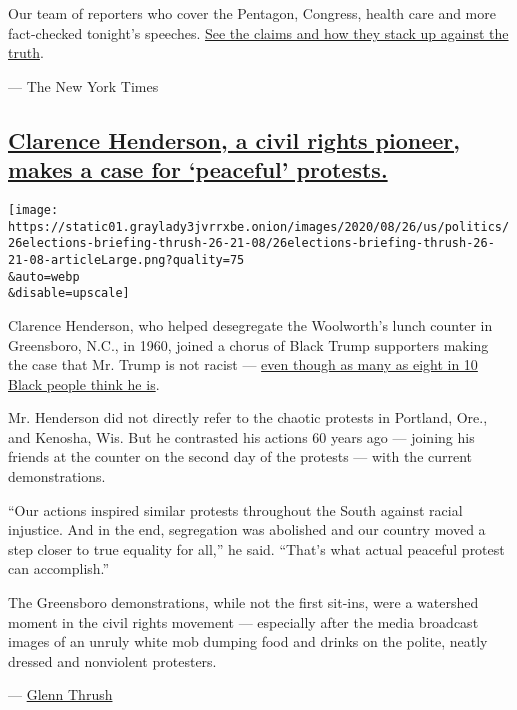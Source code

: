 Our team of reporters who cover the Pentagon, Congress, health care and
more fact-checked tonight's speeches.
\href{https://www.nytimes3xbfgragh.onion/live/2020/08/26/us/rnc-fact-check}{See
the claims and how they stack up against the truth}.

--- The New York Times

\hypertarget{clarence-henderson-a-civil-rights-pioneer-makes-a-case-for-peaceful-protests}{%
\subsection{\texorpdfstring{\protect\hyperlink{clarence-henderson-a-civil-rights-pioneer-makes-a-case-for-peaceful-protests}{Clarence
Henderson, a civil rights pioneer, makes a case for `peaceful'
protests.}}{Clarence Henderson, a civil rights pioneer, makes a case for `peaceful' protests.}}\label{clarence-henderson-a-civil-rights-pioneer-makes-a-case-for-peaceful-protests}}

\texttt{[image: https://static01.graylady3jvrrxbe.onion/images/2020/08/26/us/politics/26elections-briefing-thrush-26-21-08/26elections-briefing-thrush-26-21-08-articleLarge.png?quality=75\\\&auto=webp\\\&disable=upscale]}

Clarence Henderson, who helped desegregate the Woolworth's lunch counter
in Greensboro, N.C., in 1960, joined a chorus of Black Trump supporters
making the case that Mr. Trump is not racist ---
\href{https://www.cnn.com/2020/01/17/politics/black-voters-trump-poll/index.html}{even
though as many as eight in 10 Black people think he is}.

Mr. Henderson did not directly refer to the chaotic protests in
Portland, Ore., and Kenosha, Wis. But he contrasted his actions 60 years
ago --- joining his friends at the counter on the second day of the
protests --- with the current demonstrations.

``Our actions inspired similar protests throughout the South against
racial injustice. And in the end, segregation was abolished and our
country moved a step closer to true equality for all,'' he said.
``That's what actual peaceful protest can accomplish.''

The Greensboro demonstrations, while not the first sit-ins, were a
watershed moment in the civil rights movement --- especially after the
media broadcast images of an unruly white mob dumping food and drinks on
the polite, neatly dressed and nonviolent protesters.

--- \href{https://www.nytimes3xbfgragh.onion/by/glenn-thrush}{Glenn
Thrush}

